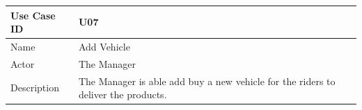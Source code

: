 \documentclass[12pt]{article}
\begin{document}
\begin{table}[H]
\begin{tabular}{|l|l|}
\hline
Use Case ID & U07                                                                                                                                                                                                                                                                                                                                                                                                                                                                                                                                              \\ \hline
Name        & Add Vehicle                                                                                                                                                                                                                                                                                                                                                                                                                                                                                                                                      \\ \hline
Actor       & The Manager                                                                                                                                                                                                                                                                                                                                                                                                                                                                                                                                      \\ \hline
Description & The Manager is able add buy a new vehicle for the riders to deliver the products.                                                                                                                                                                                                                                                                                                                                                                                                                                                                \\ \hline

\end{tabular}
\end{table}
\end{document}
